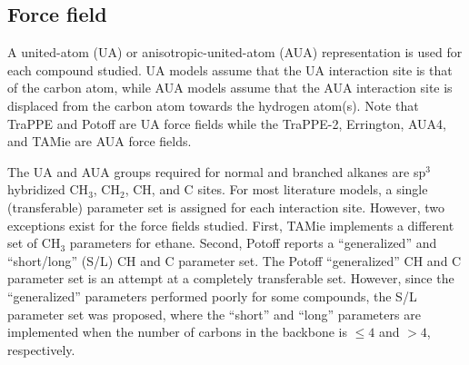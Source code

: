 \documentclass[preprint,letterpaper,floatfix,citeautoscript,aip,jcp]{revtex4-1}
\begin{document}

\subsection{Force field} \label{Force Field}

A united-atom (UA) or anisotropic-united-atom (AUA) representation is used for each compound studied. UA models assume that the UA interaction site is that of the carbon atom, while AUA models assume that the AUA interaction site is displaced from the carbon atom towards the hydrogen atom(s). Note that TraPPE and Potoff are UA force fields while the TraPPE-2, Errington, AUA4, and TAMie are AUA force fields.


The UA and AUA groups required for normal and branched alkanes are sp$^3$ hybridized CH$_3$, CH$_2$, CH, and C sites. For most literature models, a single (transferable) parameter set is assigned for each interaction site. However, two exceptions exist for the force fields studied. First, TAMie implements a different set of CH$_3$ parameters for ethane. Second, Potoff reports a ``generalized'' and ``short/long'' (S/L) CH and C parameter set. The Potoff ``generalized'' CH and C parameter set is an attempt at a completely transferable set. However, since the ``generalized'' parameters performed poorly for some compounds, the S/L parameter set was proposed, where the ``short'' and ``long'' parameters are implemented when the number of carbons in the backbone is $\le 4$ and $> 4$, respectively. 
\end{document}
